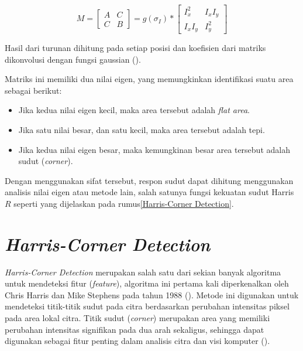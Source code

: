 \begin{equation}
  M = 
    \begin{bmatrix}
      A & C \\
      C & B
    \end{bmatrix}
    = g(\sigma_{I}) *
      \begin{bmatrix}
        I_{x}^2 & I_{x}I_{y} \\
        I_{x}I_{y} & I_{y}^2
      \end{bmatrix}
  \label{eq:SecondMomentMatrix}
\end{equation}

Hasil dari turunan dihitung pada setiap posisi dan koefisien dari matriks dikonvolusi dengan fungsi gaussian (\cite{Sanchez2018}). 

Matriks ini memiliki dua nilai eigen, yang memungkinkan identifikasi suatu area sebagai berikut:

\begin{itemize}
  \item Jika kedua nilai eigen kecil, maka area tersebut adalah \emph{flat area}.
  \item Jika satu nilai besar, dan satu kecil, maka area tersebut adalah tepi.
  \item Jika kedua nilai eigen besar, maka kemungkinan besar area tersebut adalah sudut (\emph{corner}).
\end{itemize}

Dengan menggunakan sifat tersebut, respon sudut dapat dihitung menggunakan analisis nilai eigen atau metode lain, salah satunya fungsi kekuatan sudut Harris \(R\) seperti yang dijelaskan pada rumus\ref{Harris-Corner Detection}.

\section{\emph{Harris-Corner Detection}}
  \emph{Harris-Corner Detection} merupakan salah satu dari sekian banyak algoritma untuk mendeteksi fitur (\emph{feature}), algoritma ini pertama kali diperkenalkan oleh Chris Harris dan Mike Stephens pada tahun 1988 (\cite{Harris1988}). 
Metode ini digunakan untuk mendeteksi titik-titik sudut pada citra berdasarkan perubahan intensitas piksel pada area lokal citra.
Titik sudut (\emph{corner}) merupakan area yang memiliki perubahan intensitas signifikan pada dua arah sekaligus, sehingga dapat digunakan sebagai fitur penting dalam analisis citra dan visi komputer (\cite{Harris1988}).

